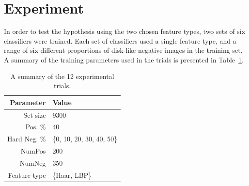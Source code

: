 \documentclass{sig-alternate-05-2015}
\newcommand{\tmpcomment}[1]{}
\begin{document}
	\section{Experiment} {
	\label{sec:experiment}

		In order to test the hypothesis using the two chosen feature types, two sets of six classifiers were trained. Each set of classifiers used a single feature type, and a range of six different proportions of disk-like negative images in the training set. A summary of the training parameters used in the trials is presented in Table~\ref{tab:training_schemes}.




		\begin{table}
			\centering
			\caption{A summary of the 12 experimental trials.}
			\label{tab:training_schemes}
			\begin{tabularx}{\columnwidth}{@{}rX@{}}
				\toprule
				\textbf{Parameter} & \textbf{Value} \\
				\midrule
        {Set size}     & 9300 \\
        {Pos. \%}      & 40 \\
        {Hard Neg. \%} & \{0, 10, 20, 30, 40, 50\} \\
        {NumPos}       & 200 \\
        {NumNeg}       & 350 \\
        {Feature type} & \{Haar, LBP\tmpcomment{, HoG}\} \\
				\bottomrule
			\end{tabularx}
		\end{table}

}
\end{document}
